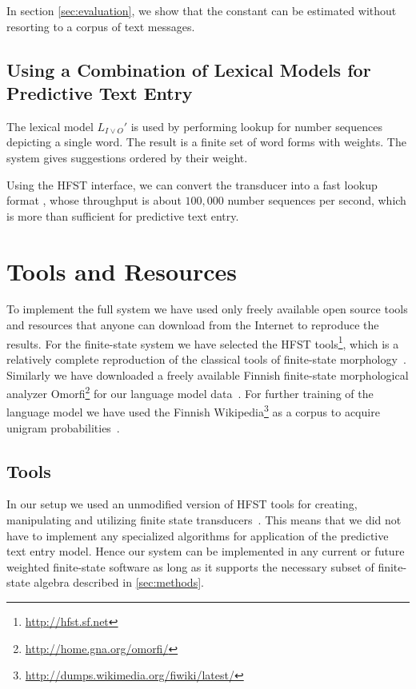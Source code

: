 \documentclass[a4paper,conference]{IEEEtran}
\begin{document}
 In section \ref{sec:evaluation}, we show that the constant can be estimated without resorting to a corpus of text messages.

\subsection{Using a Combination of Lexical Models for Predictive Text Entry}

The lexical model $L_{I\vee O}'$ is used by performing lookup for number
sequences depicting a single word. The result is a finite set of word forms with weights. The
system gives suggestions ordered by their weight.

Using the HFST interface, we can convert the transducer into a fast
lookup format \cite{conf/fsmnlp/Silfverberg2009}, whose throughput is
about $100,000$ number sequences per second, which is more than
sufficient for predictive text entry.

\section{Tools and Resources}
\label{sec:tools}

To implement the full system we have used only freely available open
source tools and resources that anyone can download from the Internet
to reproduce the results. For the finite-state system we have selected
the HFST tools\footnote{\url{http://hfst.sf.net}}, which is a relatively
complete reproduction of the classical tools of finite-state
morphology~\cite{beesley/2003}. Similarly we have downloaded a freely
available Finnish finite-state morphological analyzer
Omorfi\footnote{\url{http://home.gna.org/omorfi/}} for our language
model data~\cite{pirinen/2011/nodalida}. For further training of the
language model we have used the Finnish
Wikipedia\footnote{\url{http://dumps.wikimedia.org/fiwiki/latest/}} as a
corpus to acquire unigram probabilities~\cite{pirinen/2010/lrec}.

\subsection{Tools}

In our setup we used an unmodified version of HFST tools for creating,
manipulating and utilizing finite state
transducers~\cite{hfst/2011}. This means that we did not have to
implement any specialized algorithms for application of the predictive
text entry model. Hence our system can be implemented in any current
or future weighted finite-state software as long as it supports the
necessary subset of finite-state algebra described in
\ref{sec:methods}.
\end{document}
